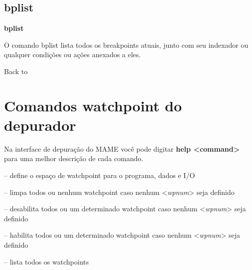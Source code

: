 \documentclass[letterpaper,10pt,brazil]{sphinxmanual}
\begin{document}
\subsection{bplist}
\label{debugger/breakpoint:debugger-command-bplist}\label{debugger/breakpoint:bplist}
\begin{DUlineblock}{0em}
\item[]
\begin{DUlineblock}{\DUlineblockindent}
\item[] \textbf{bplist}
\item[] 
\end{DUlineblock}
\item[] O comando bplist lista todos os breakpoints atuais, junto com seu indexador ou qualquer condições ou ações anexados a eles.
\item[] 
\item[] Back to {\hyperref[debugger/breakpoint:debugger\string-breakpoint\string-list]{}}
\end{DUlineblock}


\section{Comandos watchpoint do depurador}
\label{debugger/watchpoint:comandos-watchpoint-do-depurador}\label{debugger/watchpoint::doc}\label{debugger/watchpoint:debugger-watchpoints-list}
Na interface de depuração do MAME você pode digitar \textbf{help \textless{}command\textgreater{}}
para uma melhor descrição de cada comando.

\begin{DUlineblock}{0em}
\item[] {\hyperref[debugger/watchpoint:debugger\string-command\string-wpset]{}} -- define o espaço de watchpoint para o programa, dados e I/O
\item[] {\hyperref[debugger/watchpoint:debugger\string-command\string-wpclear]{}} -- limpa todos ou nenhum watchpoint caso nenhum \textless{}\emph{wpnum}\textgreater{} seja definido
\item[] {\hyperref[debugger/watchpoint:debugger\string-command\string-wpdisable]{}} -- desabilita todos ou um determinado watchpoint caso nenhum \textless{}\emph{wpnum}\textgreater{} seja definido
\item[] {\hyperref[debugger/watchpoint:debugger\string-command\string-wpenable]{}} -- habilita todos ou um determinado watchpoint caso nenhum \textless{}\emph{wpnum}\textgreater{} seja definido
\item[] {\hyperref[debugger/watchpoint:debugger\string-command\string-wplist]{}} -- lista todos os watchpoints
\end{DUlineblock}
\begin{quote}
\label{debugger/watchpoint:debugger-command-wpset}\end{quote}
\end{document}
